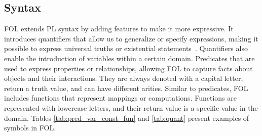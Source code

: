 \subsection{Syntax}
\label{chap:fol-syntax}
\gls{FOL} extends \gls{PL} syntax by adding features to make it more expressive. It introduces quantifiers that allow us to generalize or specify expressions, making it possible to express universal truths or existential statements~\cite{huth_2004_logic}. Quantifiers also enable the introduction of variables within a certain domain. Predicates that are used to express properties or relationships, allowing \gls{FOL} to capture facts about objects and their interactions. They are always denoted with a capital letter, return a truth value, and can have different arities. Similar to predicates, \gls{FOL} includes functions that represent mappings or computations. Functions are represented with lowercase letters, and their return value is a specific value in the domain. Tables \ref{tab:pred_var_const_fun} and \ref{tab:quant} present examples of symbols in \gls{FOL}.

\begin{table}[h!]
    \centering
    \caption{Examples of variables, constants, predicates, and functions in First-Order Logic}
    \label{tab:pred_var_const_fun}
\end{table}

\begin{table}[h!]
    \centering
    \caption{Quantifiers in First-Order Logic}
    \label{tab:quant}
\end{table}


